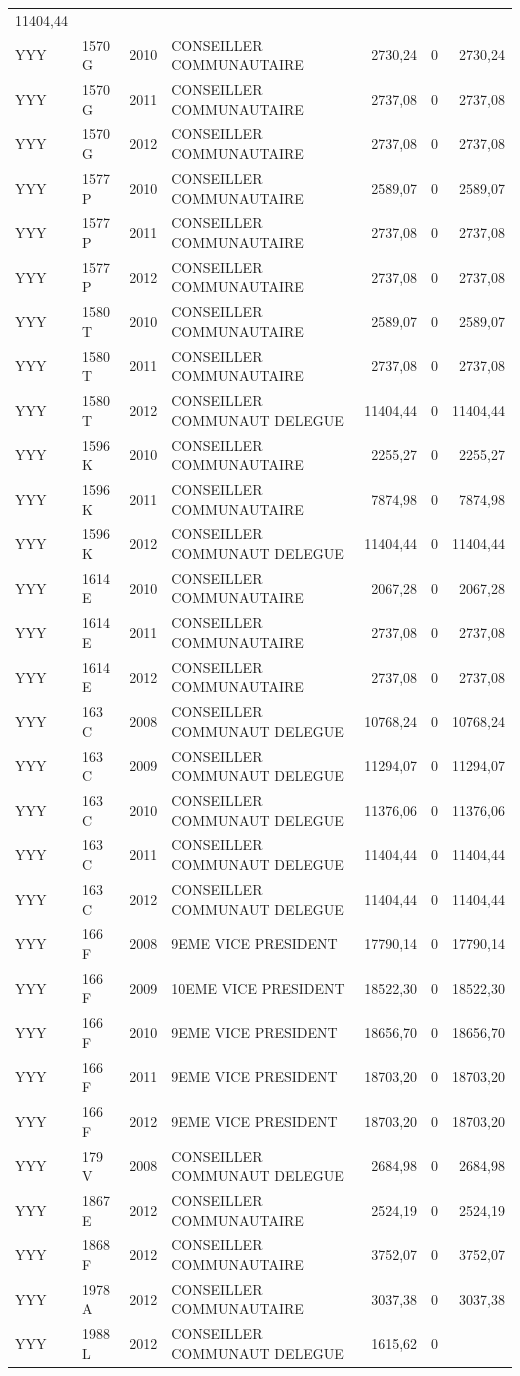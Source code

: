 \begin{longtable}[]{@{}llrlrrr@{}}
11404,44\tabularnewline
YYY & 1570 G & 2010 & CONSEILLER COMMUNAUTAIRE & 2730,24 & 0 &
2730,24\tabularnewline
YYY & 1570 G & 2011 & CONSEILLER COMMUNAUTAIRE & 2737,08 & 0 &
2737,08\tabularnewline
YYY & 1570 G & 2012 & CONSEILLER COMMUNAUTAIRE & 2737,08 & 0 &
2737,08\tabularnewline
YYY & 1577 P & 2010 & CONSEILLER COMMUNAUTAIRE & 2589,07 & 0 &
2589,07\tabularnewline
YYY & 1577 P & 2011 & CONSEILLER COMMUNAUTAIRE & 2737,08 & 0 &
2737,08\tabularnewline
YYY & 1577 P & 2012 & CONSEILLER COMMUNAUTAIRE & 2737,08 & 0 &
2737,08\tabularnewline
YYY & 1580 T & 2010 & CONSEILLER COMMUNAUTAIRE & 2589,07 & 0 &
2589,07\tabularnewline
YYY & 1580 T & 2011 & CONSEILLER COMMUNAUTAIRE & 2737,08 & 0 &
2737,08\tabularnewline
YYY & 1580 T & 2012 & CONSEILLER COMMUNAUT DELEGUE & 11404,44 & 0 &
11404,44\tabularnewline
YYY & 1596 K & 2010 & CONSEILLER COMMUNAUTAIRE & 2255,27 & 0 &
2255,27\tabularnewline
YYY & 1596 K & 2011 & CONSEILLER COMMUNAUTAIRE & 7874,98 & 0 &
7874,98\tabularnewline
YYY & 1596 K & 2012 & CONSEILLER COMMUNAUT DELEGUE & 11404,44 & 0 &
11404,44\tabularnewline
YYY & 1614 E & 2010 & CONSEILLER COMMUNAUTAIRE & 2067,28 & 0 &
2067,28\tabularnewline
YYY & 1614 E & 2011 & CONSEILLER COMMUNAUTAIRE & 2737,08 & 0 &
2737,08\tabularnewline
YYY & 1614 E & 2012 & CONSEILLER COMMUNAUTAIRE & 2737,08 & 0 &
2737,08\tabularnewline
YYY & 163 C & 2008 & CONSEILLER COMMUNAUT DELEGUE & 10768,24 & 0 &
10768,24\tabularnewline
YYY & 163 C & 2009 & CONSEILLER COMMUNAUT DELEGUE & 11294,07 & 0 &
11294,07\tabularnewline
YYY & 163 C & 2010 & CONSEILLER COMMUNAUT DELEGUE & 11376,06 & 0 &
11376,06\tabularnewline
YYY & 163 C & 2011 & CONSEILLER COMMUNAUT DELEGUE & 11404,44 & 0 &
11404,44\tabularnewline
YYY & 163 C & 2012 & CONSEILLER COMMUNAUT DELEGUE & 11404,44 & 0 &
11404,44\tabularnewline
YYY & 166 F & 2008 & 9EME VICE PRESIDENT & 17790,14 & 0 &
17790,14\tabularnewline
YYY & 166 F & 2009 & 10EME VICE PRESIDENT & 18522,30 & 0 &
18522,30\tabularnewline
YYY & 166 F & 2010 & 9EME VICE PRESIDENT & 18656,70 & 0 &
18656,70\tabularnewline
YYY & 166 F & 2011 & 9EME VICE PRESIDENT & 18703,20 & 0 &
18703,20\tabularnewline
YYY & 166 F & 2012 & 9EME VICE PRESIDENT & 18703,20 & 0 &
18703,20\tabularnewline
YYY & 179 V & 2008 & CONSEILLER COMMUNAUT DELEGUE & 2684,98 & 0 &
2684,98\tabularnewline
YYY & 1867 E & 2012 & CONSEILLER COMMUNAUTAIRE & 2524,19 & 0 &
2524,19\tabularnewline
YYY & 1868 F & 2012 & CONSEILLER COMMUNAUTAIRE & 3752,07 & 0 &
3752,07\tabularnewline
YYY & 1978 A & 2012 & CONSEILLER COMMUNAUTAIRE & 3037,38 & 0 &
3037,38\tabularnewline
YYY & 1988 L & 2012 & CONSEILLER COMMUNAUT DELEGUE & 1615,62 & 0 &

\end{longtable}

